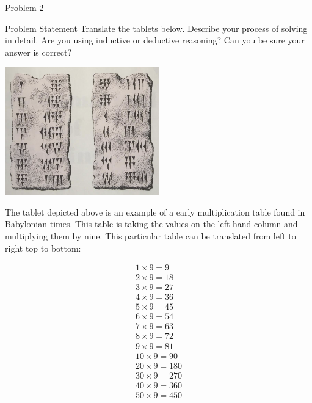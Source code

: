 \begin{problem}{Problem 2}
    \begin{statement}{Problem Statement}
        Translate the tablets below. Describe your process of solving in detail. Are you using inductive or deductive reasoning? Can you be sure your answer is correct?

        \begin{center}
            \includegraphics[width = 0.5\textwidth]{"./Images/Babylonian Tablet.png"}
        \end{center}
    \end{statement}

    \begin{highlight}[Solution]
        The tablet depicted above is an example of a early multiplication table found in Babylonian times. This table is taking the values on the left hand column and multiplying them by nine. This 
        particular table can be translated from left to right top to bottom:

        \begin{eqnarray*}
            1 \times 9 = 9 \\
            2 \times 9 = 18 \\
            3 \times 9 = 27 \\
            4 \times 9 = 36 \\
            5 \times 9 = 45 \\
            6 \times 9 = 54 \\
            7 \times 9 = 63 \\
            8 \times 9 = 72 \\
            9 \times 9 = 81 \\
            10 \times 9 = 90 \\
            20 \times 9 = 180 \\
            30 \times 9 = 270 \\
            40 \times 9 = 360 \\
            50 \times 9 = 450 \\
        \end{eqnarray*}


\end{highlight}
\end{problem}
